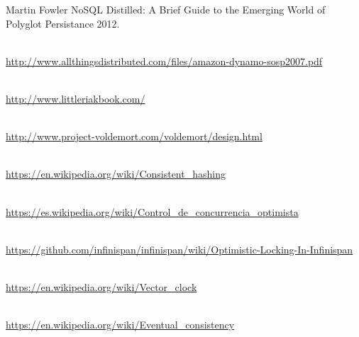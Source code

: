 \begin{thebibliography}{9}

 Martin Fowler {NoSQL Distilled: A Brief Guide to the Emerging World of Polyglot Persistance} 2012.

\\
\url{http://www.allthingsdistributed.com/files/amazon-dynamo-sosp2007.pdf}

\\
\url{http://www.littleriakbook.com/}

\\
\url{http://www.project-voldemort.com/voldemort/design.html}

 \\
\url{https://en.wikipedia.org/wiki/Consistent_hashing}

 \\
\url{https://es.wikipedia.org/wiki/Control_de_concurrencia_optimista}

 \\
\url{https://github.com/infinispan/infinispan/wiki/Optimistic-Locking-In-Infinispan}

 \\
\url{https://en.wikipedia.org/wiki/Vector_clock}

 \\
\url{https://en.wikipedia.org/wiki/Eventual_consistency}

\end{thebibliography}
